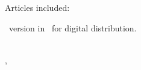 \iftrue
\begin{flushleft}%
    Articles included:%
    \AtNextBibliography{\small\singlespacing}%
    \printbibliography[%
                heading=none, %
                category=wrtxMediationArticles
                ]%
\end{flushleft}%
\fi

\begin{center}%
    {%
    \ version in \wrtxLanguageLong\ for digital distribution.%
    }%
\end{center}%



\begin{center}%
    \portfolioInstituteShort\ \portfolioCity\\%
    \portfolioCountry, %
    \portfolioDateManuscript%
\end{center}%
